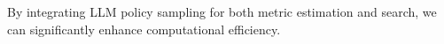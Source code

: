 \vspace{-0.2cm} 
\begin{tcolorbox}[title=Combining priority estimation and test-time search, colframe=low, boxsep=0.5mm]\footnotesize{
    By integrating LLM policy sampling for both metric estimation and search, we can significantly enhance computational efficiency.}
\end{tcolorbox}
\vspace{-0.2cm} 



